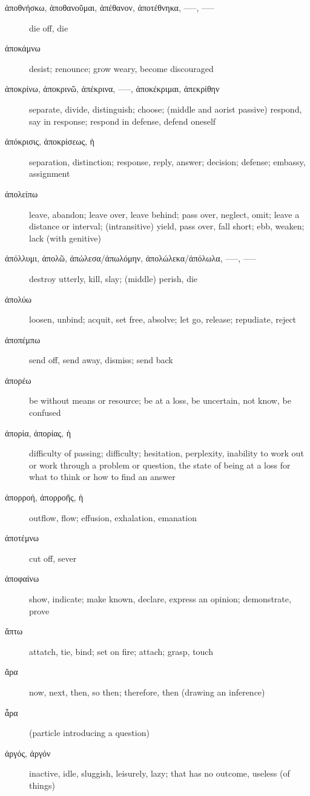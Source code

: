 \documentclass[12pt,letterpaper]{article}
\begin{document}
\begin{description}
    \item[\textgreek{ἀποθνήσκω, ἀποθανοῦμαι, ἀπέθανον, ἀποτέθνηκα, –––, –––}] \marginnote{*}die off, die
    \item[\textgreek{ἀποκάμνω}] desist; renounce; grow weary, become discouraged
    \item[\textgreek{ἀποκρίνω, ἀποκρινῶ, ἀπέκρινα, –––, ἀποκέκριμαι, ἀπεκρίθην}] \marginnote{*}separate, divide, distinguish; choose; (middle and aorist passive) respond, say in response; respond in defense, defend oneself
    \item[\textgreek{ἀπόκρισις, ἀποκρίσεως, ἡ}] separation, distinction; response, reply, answer; decision; defense; embassy, assignment
    \item[\textgreek{ἀπολείπω}] leave, abandon; leave over, leave behind;  pass over, neglect, omit; leave a distance or interval; (intransitive) yield, pass over, fall short; ebb, weaken; lack (with genitive)
    \item[\textgreek{ἀπόλλυμι, ἀπολῶ, ἀπώλεσα/ἀπωλόμην, ἀπολώλεκα/ἀπόλωλα, –––, –––}] \marginnote{*}destroy utterly, kill, slay; (middle) perish, die
    \item[\textgreek{ἀπολύω}] loosen, unbind; acquit, set free, absolve; let go, release; repudiate, reject
    \item[\textgreek{ἀποπέμπω}] send off, send away, dismiss; send back
    \item[\textgreek{ἀπορέω}] be without means or resource; be at a loss, be uncertain, not know, be confused
    \item[\textgreek{ἀπορία, ἀπορίας, ἡ}] difficulty of passing; difficulty; hesitation, perplexity, inability to work out or work through a problem or question, the state of being at a loss for what to think or how to find an answer
    \item[\textgreek{ἀπορροή, ἀπορροῆς, ἡ}] outflow, flow; effusion, exhalation, emanation
    \item[\textgreek{ἀποτέμνω}] cut off, sever
    \item[\textgreek{ἀποφαίνω}] show, indicate; make known, declare, express an opinion; demonstrate, prove
    \item[\textgreek{ἅπτω}] attatch, tie, bind; set on fire; attach; grasp, touch
    \item[\textgreek{ἄρα}] \marginnote{*}now, next, then, so then; therefore, then (drawing an inference)
    \item[\textgreek{ἆρα}] \marginnote{*}(particle introducing a question)
    \item[\textgreek{ἀργός, ἀργόν}] inactive, idle, sluggish, leisurely, lazy; that has no outcome, useless (of things)

\end{description}
\end{document}
